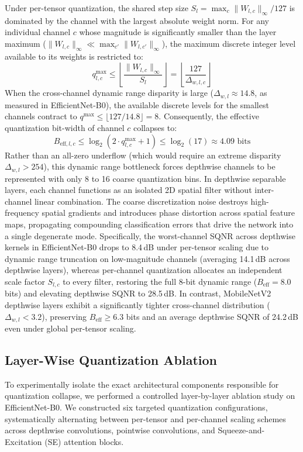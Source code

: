 \documentclass{jcse}
\begin{document}
Under per-tensor quantization, the shared step size $S_l = \max_c \|W_{l,c}\|_\infty / 127$ is dominated by the channel with the largest absolute weight norm. For any individual channel $c$ whose magnitude is significantly smaller than the layer maximum ($\|W_{l,c}\|_\infty \ll \max_{c'} \|W_{l,c'}\|_\infty$), the maximum discrete integer level available to its weights is restricted to:
\begin{equation}
q_{l,c}^{\max} \le \left\lfloor \frac{\|W_{l,c}\|_\infty}{S_l} \right\rfloor = \left\lfloor \frac{127}{\Delta_{w,l,c}} \right\rfloor
\end{equation}
When the cross-channel dynamic range disparity is large ($\Delta_{w,l} \approx 14.8$, as measured in EfficientNet-B0), the available discrete levels for the smallest channels contract to $q^{\max} \le \lfloor 127 / 14.8 \rfloor = 8$. Consequently, the effective quantization bit-width of channel $c$ collapses to:
\begin{equation}
B_{\text{eff},l,c} \le \log_2 \left( 2 \cdot q_{l,c}^{\max} + 1 \right) \le \log_2(17) \approx 4.09 \text{ bits}
\end{equation}
Rather than an all-zero underflow (which would require an extreme disparity $\Delta_{w,l} > 254$), this dynamic range bottleneck forces depthwise channels to be represented with only 8 to 16 coarse quantization bins. In depthwise separable layers, each channel functions as an isolated 2D spatial filter without inter-channel linear combination. The coarse discretization noise destroys high-frequency spatial gradients and introduces phase distortion across spatial feature maps, propagating compounding classification errors that drive the network into a single degenerate mode. Specifically, the worst-channel SQNR across depthwise kernels in EfficientNet-B0 drops to 8.4\,dB under per-tensor scaling due to dynamic range truncation on low-magnitude channels (averaging 14.1\,dB across depthwise layers), whereas per-channel quantization allocates an independent scale factor $S_{l,c}$ to every filter, restoring the full 8-bit dynamic range ($B_{\text{eff}} = 8.0$ bits) and elevating depthwise SQNR to 28.5\,dB. In contrast, MobileNetV2 depthwise layers exhibit a significantly tighter cross-channel distribution ($\Delta_{w,l} < 3.2$), preserving $B_{\text{eff}} \ge 6.3$ bits and an average depthwise SQNR of 24.2\,dB even under global per-tensor scaling.

\subsection{Layer-Wise Quantization Ablation}
To experimentally isolate the exact architectural components responsible for quantization collapse, we performed a controlled layer-by-layer ablation study on EfficientNet-B0. We constructed six targeted quantization configurations, systematically alternating between per-tensor and per-channel scaling schemes across depthwise convolutions, pointwise convolutions, and Squeeze-and-Excitation (SE) attention blocks.
\end{document}
